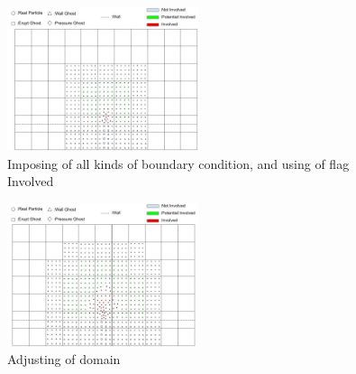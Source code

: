 \documentclass[10pt,a4paper]{article}
\begin{document}
{
\begin{figure}[h]
\caption{Imposing of all kinds of boundary condition, and using of flag Involved}
\centering
\label{fig:Involved_initial}
\includegraphics[width=0.5\textwidth]{Involved_initial}
\end{figure}

\begin{figure}[h]
\caption{Adjusting of domain}
\centering
\label{fig:Involved_domain_adjusting}
\includegraphics[width=0.5\textwidth]{Involved_domain_adjusting}
\end{figure}
}
\end{document}
